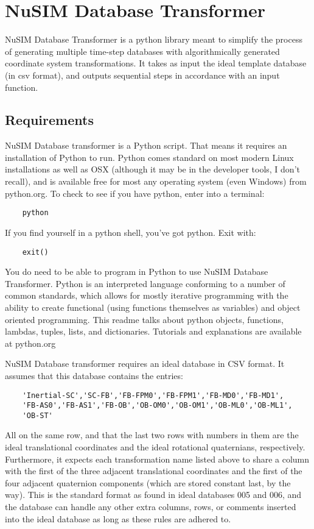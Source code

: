 \section{NuSIM Database Transformer}
NuSIM Database Transformer is a python library meant to simplify the process of generating multiple time-step databases with algorithmically generated coordinate system transformations. It takes as input the ideal template database (in csv format), and outputs sequential steps in accordance with an input function. 

\subsection{Requirements}
	NuSIM Database transformer is a Python script. That means it 
requires an installation of Python to run. Python comes standard on most 
modern Linux installations as well as OSX (although it may be in the 
developer tools, I don't recall), and is available free for most any 
operating system (even Windows) from python.org. To check to see if you 
have python, enter into a terminal:
\begin{verbatim}
	python
\end{verbatim}
If you find yourself in a python shell, you've got python. Exit with:
\begin{verbatim}
	exit()
\end{verbatim}
	You do need to be able to program in Python to use NuSIM Database 
Transformer. Python is an interpreted language conforming to a number of 
common standards, which allows for mostly iterative programming with the 
ability to create functional (using functions themselves as variables) and 
object oriented programming. This readme talks about python objects,
functions, lambdas, tuples, lists, and dictionaries. Tutorials and 
explanations are available at python.org

	NuSIM Database transformer requires an ideal database in CSV 
format. It assumes that this database contains the entries:
\begin{verbatim}
	'Inertial-SC','SC-FB','FB-FPM0','FB-FPM1','FB-MD0','FB-MD1',
	'FB-AS0','FB-AS1','FB-OB','OB-OM0','OB-OM1','OB-ML0','OB-ML1',
	'OB-ST'
\end{verbatim}
All on the same row, and that the last two rows with numbers in them are 
the ideal translational coordinates and the ideal rotational quaternians, 
respectively. Furthermore, it expects each transformation name listed above 
to share a column with the first of the three adjacent translational 
coordinates and the first of the four adjacent quaternion components (which 
are stored constant last, by the way). This is the standard format as found 
in ideal databases 005 and 006, and the database can handle any other extra 
columns, rows, or comments inserted into the ideal database as long as 
these rules are adhered to. 

